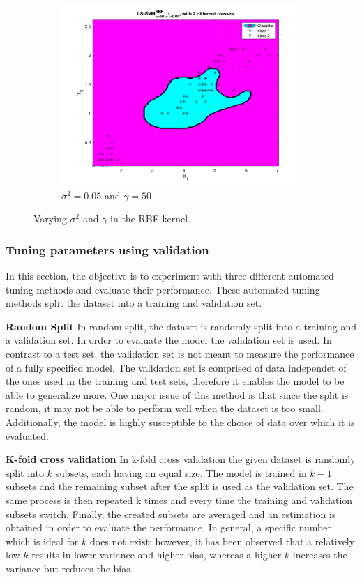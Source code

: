 \documentclass[a4paper, 11pt, one column]{article}
\begin{document}
\begin{figure}[]
\begin{subfigure}{0.33\linewidth}
            \includegraphics[width=\linewidth]{images/ls_svm_rbf_g50_s0.05.png}
            \caption{$\sigma^2=0.05$ and $\gamma=50$}
        \end{subfigure}
        \caption{Varying $\sigma^2$ and $\gamma$  in the RBF kernel.}       
        \label{fig:rbfvarcsigma}
    \end{figure}


\subsubsection{Tuning parameters using validation}
In this section, the objective is to experiment with three different automated tuning methods and evaluate their performance. These automated tuning methods split the dataset into a training and validation set. 

\textbf{Random Split}
In random split, the dataset is randomly split into a training and a validation set. In order to evaluate the model the validation set is used. In contrast to a test set, the validation set is not meant to measure the performance of a fully specified model. The validation set is comprised of data independet of the ones used in the training and test sets, therefore it enables the model to be able to generalize more. One major issue of this method is that since the split is random, it may not be able to perform well when the dataset is too small. Additionally, the model is highly susceptible to the choice of data over which it is evaluated. 

\textbf{K-fold cross validation}
In k-fold cross validation the given dataset is randomly split into $k$ subsets, each having an equal size. The model is trained in $k-1$ subsets and the remaining subset after the split is used as the validation set. The same process is then repeated k times and every time the training and validation subsets switch. Finally, the created subsets are averaged and an estimation is obtained in order to evaluate the performance. In general, a specific number which is ideal for $k$ does not exist; however, it has been observed that a relatively low $k$ results in lower variance and higher bias, whereas a higher $k$ increases the variance but reduces the bias. 
\end{document}
